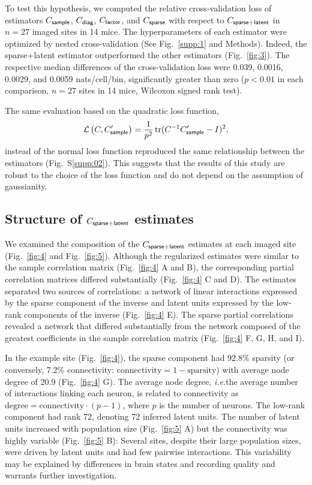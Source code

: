 To test this hypothesis, we computed the relative cross-validation loss of estimators  $C_{\sf sample}$, $C_{\sf diag}$, $C_{\sf factor}$, and $C_{\sf sparse}$ with respect to $C_{\sf sparse+latent}$ in $n=27$ imaged sites in 14 mice.  The hyperparameters of each estimator were optimized by nested cross-validation (See Fig.~\ref{supp:1} and  Methods). Indeed, the sparse+latent estimator outperformed the other estimators (Fig.~\ref{fig:3}). The respective median differences of the cross-validation loss were 0.039, 0.0016, 0.0029, and 0.0059 nats/cell/bin, significantly greater than zero ($p<0.01$ in each comparison, $n=27$ sites in 14 mice, Wilcoxon signed rank test).

The same evaluation based on the quadratic loss function,
\begin{equation}\label{eq:quad}
\mathcal L\left(C,C_{\sf sample}^\prime\right)=\frac 1 {p^2}\operatorname{tr}(C^{-1}C_{\sf sample}^\prime-I)^2,
\end{equation}
instead of the normal loss function reproduced the same relationship between the estimators (Fig.~S\ref{supp:02}). This suggests that the results of this study are robust to the choice of the loss function and do not depend on the assumption of gaussianity.

\subsection*{Structure of $C_{\sf sparse+latent}$ estimates}
We examined the composition of the $C_{\sf sparse+latent}$ estimates at each imaged site (Fig.~\ref{fig:4} and Fig.~\ref{fig:5}). Although the regularized estimates were similar to the sample correlation matrix (Fig.~\ref{fig:4} A and B), the corresponding partial correlation matrices differed substantially (Fig.~\ref{fig:4} C and D). The estimates separated two sources of correlations: a network of linear interactions expressed by the sparse component of the inverse and latent units expressed by the low-rank components of the inverse (Fig.~\ref{fig:4} E). The sparse partial correlations revealed a network that differed substantially from the network composed of the greatest coefficients in the sample correlation matrix (Fig.~\ref{fig:4} F, G, H, and I).

In the example site (Fig.~\ref{fig:4}), the sparse component had 92.8\% sparsity (or conversely, 7.2\% connectivity: $\mbox{connectivity}=1-\mbox{sparsity}$) with average node degree of 20.9 (Fig.~\ref{fig:4} G). The average node degree, \emph{i.e.}\;the average number of interactions linking each neuron, is related to connectivity as $\mbox{degree} = \mbox{connectivity}\cdot(p-1)$, where $p$ is the number of neurons. The low-rank component had rank 72, denoting 72 inferred latent units. The number of latent units increased with population size (Fig.~\ref{fig:5} A) but the connectivity was highly variable (Fig.~\ref{fig:5} B): Several sites, despite their large population sizes, were driven by latent units and had few pairwise interactions. This variability may be explained by differences in brain states and recording quality and warrants further investigation.

